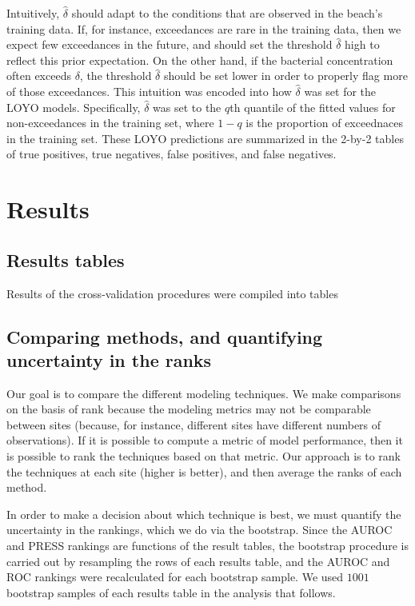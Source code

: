 \documentclass[english]{article}\usepackage[]{graphicx}\usepackage[]{color}
\numberwithin{equation}{section}
\numberwithin{figure}{section}
\renewcommand\[{\begin{equation}}
\renewcommand\]{\end{equation}}
\begin{document}
Intuitively, $\hat{\delta}$ should adapt to the conditions that are
observed in the beach's training data. If, for instance, exceedances
are rare in the training data, then we expect few exceedances in the
future, and should set the threshold $\hat{\delta}$ high to reflect
this prior expectation. On the other hand, if the bacterial concentration
often exceeds $\delta$, the threshold $\hat{\delta}$ should be set
lower in order to properly flag more of those exceedances. This intuition
was encoded into how $\hat{\delta}$ was set for the LOYO models.
Specifically, $\hat{\delta}$ was set to the $q$th quantile of the
fitted values for non-exceedances in the training set, where $1-q$
is the proportion of exceednaces in the training set. These LOYO predictions
are summarized in the 2-by-2 tables of true positives, true negatives,
false positives, and false negatives.


\section{Results}


\subsection{Results tables}

Results of the cross-validation procedures were compiled into tables




\subsection{Comparing methods, and quantifying uncertainty in the ranks}

Our goal is to compare the different modeling techniques. We make
comparisons on the basis of rank because the modeling metrics may
not be comparable between sites (because, for instance, different
sites have different numbers of observations). If it is possible to
compute a metric of model performance, then it is possible to rank
the techniques based on that metric. Our approach is to rank the techniques
at each site (higher is better), and then average the ranks of each
method.

In order to make a decision about which technique is best, we must
quantify the uncertainty in the rankings, which we do via the bootstrap.
Since the AUROC and PRESS rankings are functions of the result tables,
the bootstrap procedure is carried out by resampling the rows of each
results table, and the AUROC and ROC rankings were recalculated for
each bootstrap sample. We used $1001$ bootstrap samples of each results
table in the analysis that follows.
\end{document}
